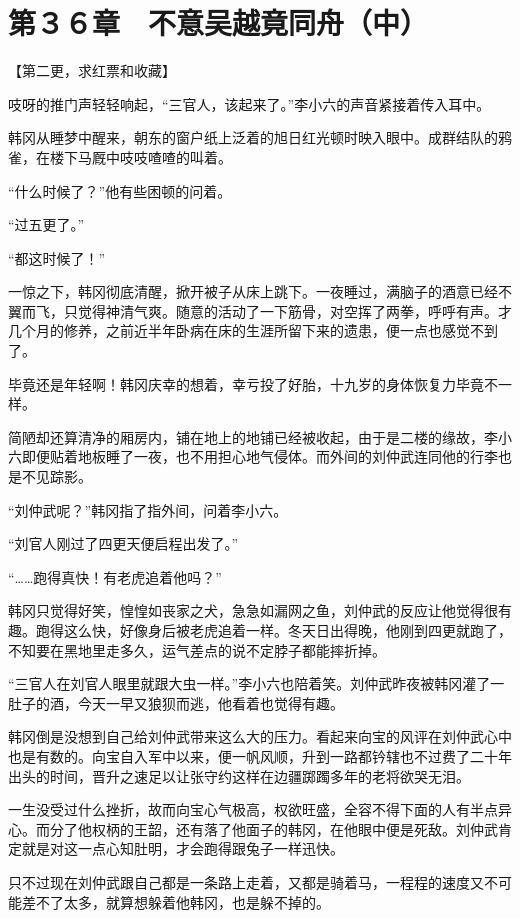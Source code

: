 \section{第３６章　不意吴越竟同舟（中）}

【第二更，求红票和收藏】

吱呀的推门声轻轻响起，“三官人，该起来了。”李小六的声音紧接着传入耳中。

韩冈从睡梦中醒来，朝东的窗户纸上泛着的旭日红光顿时映入眼中。成群结队的鸦雀，在楼下马厩中吱吱喳喳的叫着。

“什么时候了？”他有些困顿的问着。

“过五更了。”

“都这时候了！”

一惊之下，韩冈彻底清醒，掀开被子从床上跳下。一夜睡过，满脑子的酒意已经不翼而飞，只觉得神清气爽。随意的活动了一下筋骨，对空挥了两拳，呼呼有声。才几个月的修养，之前近半年卧病在床的生涯所留下来的遗患，便一点也感觉不到了。

毕竟还是年轻啊！韩冈庆幸的想着，幸亏投了好胎，十九岁的身体恢复力毕竟不一样。

简陋却还算清净的厢房内，铺在地上的地铺已经被收起，由于是二楼的缘故，李小六即便贴着地板睡了一夜，也不用担心地气侵体。而外间的刘仲武连同他的行李也是不见踪影。

“刘仲武呢？”韩冈指了指外间，问着李小六。

“刘官人刚过了四更天便启程出发了。”

“……跑得真快！有老虎追着他吗？”

韩冈只觉得好笑，惶惶如丧家之犬，急急如漏网之鱼，刘仲武的反应让他觉得很有趣。跑得这么快，好像身后被老虎追着一样。冬天日出得晚，他刚到四更就跑了，不知要在黑地里走多久，运气差点的说不定脖子都能摔折掉。

“三官人在刘官人眼里就跟大虫一样。”李小六也陪着笑。刘仲武昨夜被韩冈灌了一肚子的酒，今天一早又狼狈而逃，他看着也觉得有趣。

韩冈倒是没想到自己给刘仲武带来这么大的压力。看起来向宝的风评在刘仲武心中也是有数的。向宝自入军中以来，便一帆风顺，升到一路都钤辖也不过费了二十年出头的时间，晋升之速足以让张守约这样在边疆踯躅多年的老将欲哭无泪。

一生没受过什么挫折，故而向宝心气极高，权欲旺盛，全容不得下面的人有半点异心。而分了他权柄的王韶，还有落了他面子的韩冈，在他眼中便是死敌。刘仲武肯定就是对这一点心知肚明，才会跑得跟兔子一样迅快。

只不过现在刘仲武跟自己都是一条路上走着，又都是骑着马，一程程的速度又不可能差不了太多，就算想躲着他韩冈，也是躲不掉的。

